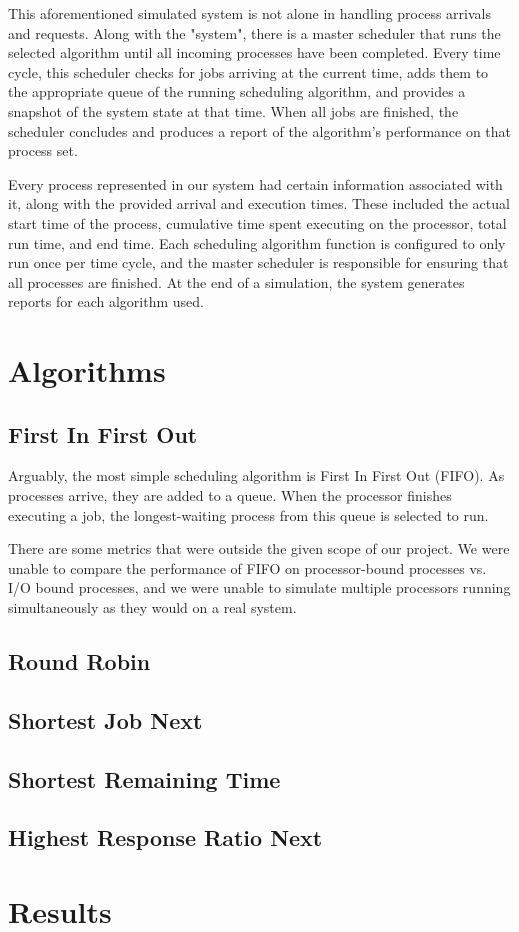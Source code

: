 \documentclass[conference,11pt]{IEEEtran}
\begin{document}
This aforementioned simulated system is not alone in handling process arrivals and requests. Along with the "system", there is a master scheduler that runs the selected algorithm until all incoming processes have been completed. Every time cycle, this scheduler checks for jobs arriving at the current time, adds them to the appropriate queue of the running scheduling algorithm, and provides a snapshot of the system state at that time. When all jobs are finished, the scheduler concludes and produces a report of the algorithm's performance on that process set.

Every process represented in our system had certain information associated with it, along with the provided arrival and execution times. These included the actual start time of the process, cumulative time spent executing on the processor, total run time, and end time. Each scheduling algorithm function is configured to only run once per time cycle, and the master scheduler is responsible for ensuring that all processes are finished. At the end of a simulation, the system generates reports for each algorithm used.

\section{Algorithms}

\subsection{First In First Out}
Arguably, the most simple scheduling algorithm is First In First Out (FIFO). As processes arrive, they are added to a queue. When the processor finishes executing a job, the longest-waiting process from this queue is selected to run.

There are some metrics that were outside the given scope of our project. We were unable to compare the performance of FIFO on processor-bound processes vs. I/O bound processes, and we were unable to simulate multiple processors running simultaneously as they would on a real system.

\subsection{Round Robin}


\subsection{Shortest Job Next}


\subsection{Shortest Remaining Time}


\subsection{Highest Response Ratio Next}


\section{Results}
\end{document}
